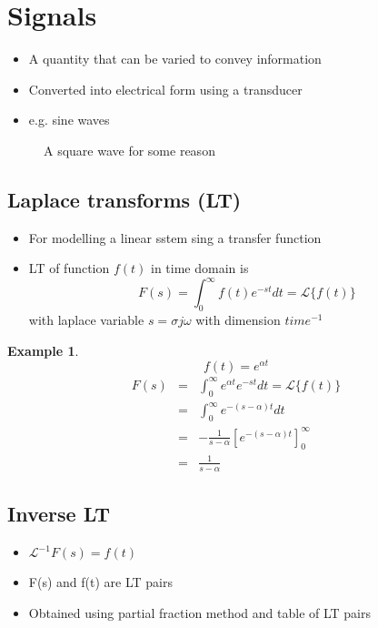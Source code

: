 \documentclass[11pt]{article} %
\theoremstyle{definition}
\newtheorem{example}{Example}[subsection]
\begin{document}
\section{Signals}
	\begin{itemize}
	\item A quantity that can be varied to convey information
	\item Converted into electrical form using a transducer
	\item e.g. sine waves
		
	\end{itemize}

	\begin{figure}[h]
		\centering
		\caption{A square wave for some reason}
	\end{figure}

\subsection{Laplace transforms (LT)}
	\begin{itemize}
	\item For modelling a linear sstem sing a transfer function
	\item LT of function $f(t)$ in time domain is
		\begin{equation}
			F(s) = \int^\infty _0 f(t)e^{-st}dt =\mathcal{L}\{f(t)\}
		\end{equation}
		with laplace variable $s = \sigma j\omega$ with dimension $time^{-1}$
	\end{itemize}

\begin{example}
	\begin{equation}
		f(t) =  e^{\alpha t} 
	\end{equation}
	\begin{eqnarray}
		F(s) &=& \int^\infty_0 e^{\alpha t} e^{-st} dt = \mathcal{L}\{f(t)\} \nonumber \\
		&=& \int^\infty_0 e^{-(s-\alpha)t} dt \nonumber \\
		&=& -\frac{1}{s-\alpha}\left[{e^{-(s-\alpha)t}}\right]_0^\infty \nonumber \\
		&=& \frac{1}{s-\alpha}
	\end{eqnarray}
\end{example}
\subsection{Inverse LT}
	\begin{itemize}
		\item $\mathcal{L}^{-1} F(s)=f(t)$
		\item F(s) and  f(t) are LT pairs
		\item Obtained using partial fraction method and table of LT pairs
	\end{itemize}
\end{document}
